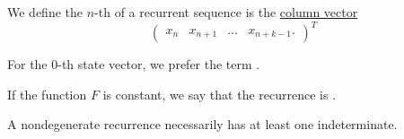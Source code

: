 \begin{definition}
\begin{thmenum}
     We define the \( n \)-th  of a recurrent sequence is the \hyperref[def:array/column_vector]{column vector}
    \begin{equation*}
      \begin{pmatrix}
        x_n & x_{n+1} & \ldots & x_{n+k-1}.
      \end{pmatrix}^T
    \end{equation*}

    For the \( 0 \)-th state vector, we prefer the term .

     If the function \( F \) is constant, we say that the recurrence is .

    A nondegenerate recurrence necessarily has at least one indeterminate.
  \end{thmenum}
\end{definition}

